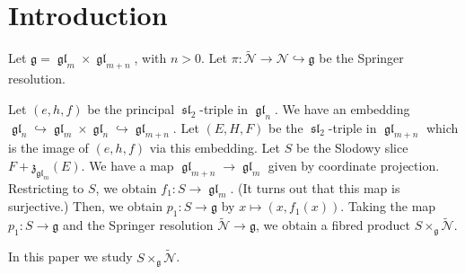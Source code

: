 \documentclass[12pt,psamsfonts]{article}
\DeclareMathOperator{\gl}{\mathfrak{gl}}
\DeclareMathOperator{\spl}{\mathfrak{sl}}
\begin{document}

\section{Introduction}
Let \(\mathfrak{g} = \gl_m \times \gl_{m + n}\), with \(n > 0\).
Let \(\pi : \widetilde{\mathcal{N}} \to \mathcal{N} \hookrightarrow \mathfrak{g}\) be the Springer resolution.
\par Let \((e, h, f)\) be the principal \(\spl_2\)-triple in \(\gl_n\).
We have an embedding \(\gl_n \hookrightarrow \gl_m \times \gl_n \hookrightarrow \gl_{m + n}\).
Let \((E, H, F)\) be the \(\spl_2\)-triple in \(\gl_{m + n}\) which is the image of \((e, h, f)\) via this embedding.
Let \(S\) be the Slodowy slice \(F + \mathfrak{z}_{\gl_m}(E)\).
We have a map \(\gl_{m + n} \to \gl_m\) given by coordinate projection.
Restricting to \(S\), we obtain \(f_1 : S \to \gl_m\).
(It turns out that this map is surjective.)
Then, we obtain \(p_1 : S \to \mathfrak{g}\) by \(x \mapsto (x, f_1(x))\).
Taking the map \(p_1 : S \to \mathfrak{g}\) and the Springer resolution \(\widetilde{\mathcal{N}} \to \mathfrak{g}\), we obtain a fibred product \(S \times_\mathfrak{g} \widetilde{\mathcal{N}}\).
\par In this paper we study \(S \times_\mathfrak{g} \widetilde{\mathcal{N}}\).
\end{document}

